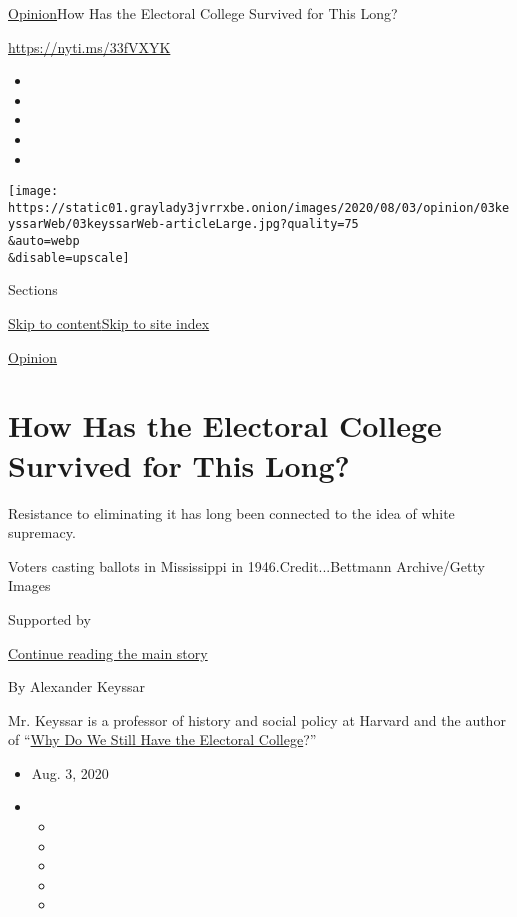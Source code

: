\href{/section/opinion}{Opinion}\textbar{}How Has the Electoral College
Survived for This Long?

\url{https://nyti.ms/33fVXYK}

\begin{itemize}
\item
\item
\item
\item
\item
\end{itemize}

\texttt{[image: https://static01.graylady3jvrrxbe.onion/images/2020/08/03/opinion/03keyssarWeb/03keyssarWeb-articleLarge.jpg?quality=75\\\&auto=webp\\\&disable=upscale]}

Sections

\protect\hyperlink{site-content}{Skip to
content}\protect\hyperlink{site-index}{Skip to site index}

\href{/section/opinion}{Opinion}

\hypertarget{how-has-the-electoral-college-survived-for-this-long}{%
\section{How Has the Electoral College Survived for This
Long?}\label{how-has-the-electoral-college-survived-for-this-long}}

Resistance to eliminating it has long been connected to the idea of
white supremacy.

Voters casting ballots in Mississippi in 1946.Credit...Bettmann
Archive/Getty Images

Supported by

\protect\hyperlink{after-sponsor}{Continue reading the main story}

By Alexander Keyssar

Mr. Keyssar is a professor of history and social policy at Harvard and
the author of
``\href{https://www.hup.harvard.edu/catalog.php?isbn=9780674660151\#:~:text=After\%20tracing\%20the\%20Electoral\%20College's,showing\%20why\%20each\%20has\%20failed.}{Why
Do We Still Have the Electoral College}?''

\begin{itemize}
\item
  Aug. 3, 2020
\item
  \begin{itemize}
  \item
  \item
  \item
  \item
  \item
  \end{itemize}
\end{itemize}


